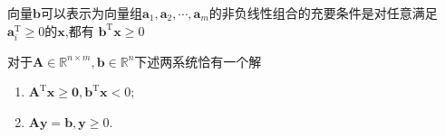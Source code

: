 \begin{theorem}[Farkas引理]
    向量$\boldsymbol{b}$可以表示为向量组$\boldsymbol{a}_1,\boldsymbol{a}_2,\cdots,\boldsymbol{a}_m$的非负线性组合的充要条件是对任意满足$\boldsymbol{a}_{i}^{\mathrm{T}}\geqslant 0$的$\boldsymbol{x}$,都有
    $\boldsymbol{b}^{\mathrm{T}}\boldsymbol{x}\geqslant 0$
\end{theorem}
\begin{theorem}[Farkas引理']
    对于$\boldsymbol{A}\in\mathbb{R}^{n\times m},\boldsymbol{b}\in\mathbb{R}^{n}$下述两系统恰有一个解
    \begin{enumerate}
        \item $\boldsymbol{A}^\mathrm{T}\boldsymbol{x}\geqslant\boldsymbol{0},\boldsymbol{b}^\mathrm{T}\boldsymbol{x}<0;$
        \item $\boldsymbol{Ay}=\boldsymbol{b},\boldsymbol{y}\geqslant0.$
    \end{enumerate}
\end{theorem}
